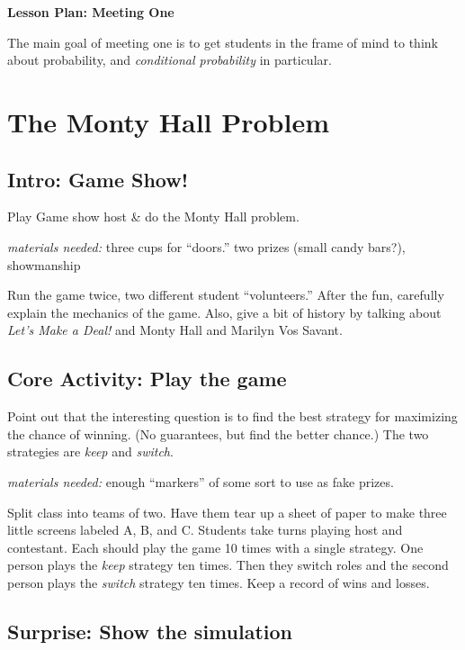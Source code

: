 \documentclass[12pt]{amsart}
\theoremstyle{definition}
\begin{document}
\begin{center}
\textbf{\Huge
Lesson Plan: Meeting One
}
\end{center}
\vspace{.5in}

The main goal of meeting one is to get students in the frame of mind to think about probability, and \emph{conditional probability} in particular.

\section*{The Monty Hall Problem}

\subsection*{Intro: Game Show!}

Play Game show host \& do the Monty Hall problem. 

\emph{materials needed:} three cups for ``doors.'' two prizes (small candy bars?), showmanship

Run the game twice, two different student ``volunteers.'' 
After the fun, carefully explain the mechanics of the game. 
Also, give a bit of history by talking about \emph{Let's Make a Deal!} and Monty Hall and Marilyn Vos Savant.

\subsection*{Core Activity: Play the game}

Point out that the interesting question is to find the best strategy for maximizing the chance of winning. 
(No guarantees, but find the better chance.) 
The two strategies are \emph{keep} and \emph{switch}. 

\emph{materials needed:} enough ``markers'' of some sort to use as fake prizes.

Split class into teams of two. 
Have them tear up a sheet of paper to make three little screens labeled A, B, and C. 
Students take turns playing host and contestant. 
Each should play the game 10 times with a single strategy. 
One person plays the \emph{keep} strategy ten times. 
Then they switch roles and the second person plays the \emph{switch} strategy ten times. 
Keep a record of wins and losses.

\subsection*{Surprise: Show the simulation}
\end{document}
